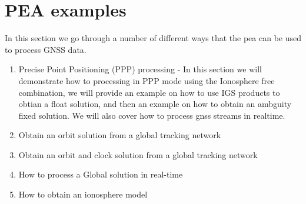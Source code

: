 \chapter{PEA examples}
\label{ch:pea_examples}

In this section we go through a number of different ways that the pea can be used to process GNSS data.
\begin{enumerate}
	\item Precise Point Positioning (PPP) processing - In this section we will demonstrate how to processing in PPP mode using the Ionosphere free combination, we will provide an example on how to use IGS products to obtian a float solution, and then an example on how to obtain an ambguity fixed solution. We will also cover how to process gnss streams in realtime.
	\item Obtain an orbit solution from a global tracking network
	\item Obtain an orbit and clock solution from a global tracking network
	\item How to process a Global solution in real-time
	\item How to obtain an ionosphere model 
\end{enumerate}
%

